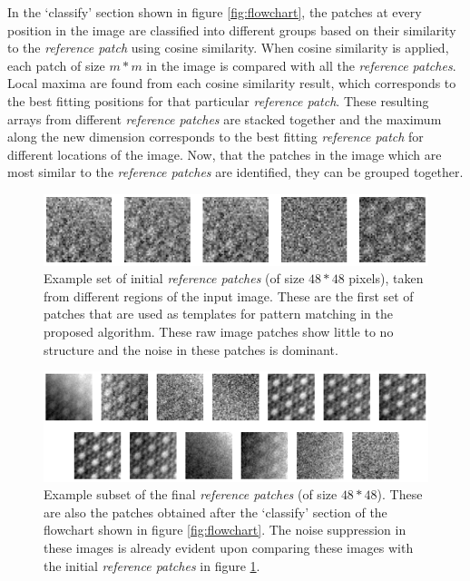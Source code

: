 \documentclass[fleqn,10pt]{wlscirep}
\begin{document}
	
	In the `classify' section shown in figure \ref{fig:flowchart}, the patches at every position in the image are classified into different groups based on their similarity to the \textit{reference patch} using cosine similarity. When cosine similarity is applied, each patch of size $m*m$ in the image is compared with all the \textit{reference patches}. Local maxima are found from each cosine similarity result, which corresponds to the best fitting positions for that particular \textit{reference patch}. These resulting arrays from different \textit{reference patches} are stacked together and the maximum along the new dimension corresponds to the best fitting \textit{reference patch} for different locations of the image. Now, that the patches in the image which are most similar to the \textit{reference patches} are identified, they can be grouped together.
	
	\vspace{1cm }
	
	\begin{figure}[H]
		\centering
		\includegraphics[scale=0.85]{./imgs/initial_reference_patches.png}
		\caption{Example set of initial \textit{reference patches} (of size $48*48$ pixels), taken from different regions of the input image. These are the first set of patches that are used as templates for pattern matching in the proposed algorithm. These raw image patches show little to no structure and the noise in these patches is dominant. }
		\label{fig:initial_reference_patches}
	\end{figure} 
	
	\begin{figure}[H]
		\centering
		\includegraphics[scale=1.2]{./imgs/final_reference_patches.png}
		\caption{Example subset of the final \textit{reference patches} (of size $48*48$). These are also the patches obtained after the `classify' section of the flowchart shown in figure \ref{fig:flowchart}. The noise suppression in these images is already evident upon comparing these images with the initial \textit{reference patches} in figure \ref{fig:initial_reference_patches}.}
		\label{fig:final_reference_patches}
	\end{figure} 
	
\end{document}
